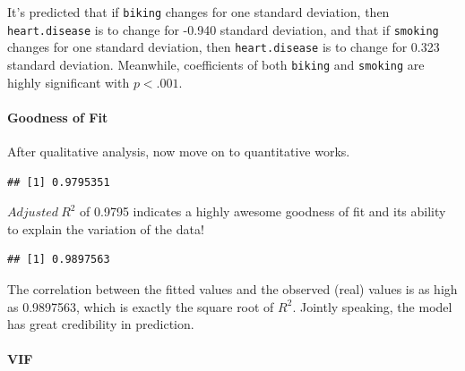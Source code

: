 \documentclass[
]{ctexart}
\newenvironment{Shaded}{\begin{snugshade}}{\end{snugshade}}
\newcommand{\AttributeTok}[1]{\textcolor[rgb]{0.13,0.29,0.53}{#1}}
\newcommand{\FunctionTok}[1]{\textcolor[rgb]{0.13,0.29,0.53}{\textbf{#1}}}
\newcommand{\NormalTok}[1]{#1}
\newcommand{\OtherTok}[1]{\textcolor[rgb]{0.56,0.35,0.01}{#1}}
\newcommand{\SpecialCharTok}[1]{\textcolor[rgb]{0.81,0.36,0.00}{\textbf{#1}}}
\begin{document}
It's predicted that if \texttt{biking} changes for one standard
deviation, then \texttt{heart.disease} is to change for -0.940 standard
deviation, and that if \texttt{smoking} changes for one standard
deviation, then \texttt{heart.disease} is to change for 0.323 standard
deviation. Meanwhile, coefficients of both \texttt{biking} and
\texttt{smoking} are highly significant with \(p<.001\).

\hypertarget{goodness-of-fit-4}{%
\paragraph{Goodness of Fit}\label{goodness-of-fit-4}}

After qualitative analysis, now move on to quantitative works.

\begin{Shaded}
\end{Shaded}

\begin{verbatim}
## [1] 0.9795351
\end{verbatim}

\(Adjusted\ R^2\) of 0.9795 indicates a highly awesome goodness of fit
and its ability to explain the variation of the data!

\begin{Shaded}
\end{Shaded}

\begin{verbatim}
## [1] 0.9897563
\end{verbatim}

The correlation between the fitted values and the observed (real) values
is as high as 0.9897563, which is exactly the square root of \(R^2\).
Jointly speaking, the model has great credibility in prediction.

\hypertarget{vif}{%
\paragraph{VIF}\label{vif}}
\end{document}
